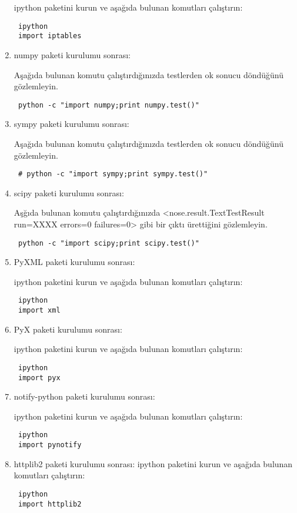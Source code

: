 \documentclass[a4paper,10pt]{article}
\begin{document}
\begin{enumerate}
ipython paketini kurun ve aşağıda bulunan komutları çalıştırın:
\begin{verbatim}
 ipython
 import iptables
\end{verbatim}

\item numpy paketi kurulumu sonrası:

Aşağıda bulunan komutu çalıştırdığınızda testlerden ok sonucu döndüğünü gözlemleyin.
\begin{verbatim}
 python -c "import numpy;print numpy.test()"
\end{verbatim}

\item sympy paketi kurulumu sonrası:

Aşağıda bulunan komutu çalıştırdığınızda testlerden ok sonucu döndüğünü gözlemleyin.
\begin{verbatim}
 # python -c "import sympy;print sympy.test()"
\end{verbatim}

\item scipy paketi kurulumu sonrası:

Aşğıda bulunan komutu çalıştırdığınızda <nose.result.TextTestResult run=XXXX errors=0 failures=0> gibi bir çıktı ürettiğini gözlemleyin.
\begin{verbatim}
 python -c "import scipy;print scipy.test()"
\end{verbatim}

\item PyXML paketi kurulumu sonrası:

ipython paketini kurun ve aşağıda bulunan komutları çalıştırın:
\begin{verbatim}
 ipython
 import xml
\end{verbatim}


\item PyX paketi kurulumu sonrası:

ipython paketini kurun ve aşağıda bulunan komutları çalıştırın:
\begin{verbatim}
 ipython
 import pyx
\end{verbatim}

\item notify-python paketi kurulumu sonrası:

ipython paketini kurun ve aşağıda bulunan komutları çalıştırın:
\begin{verbatim}
 ipython
 import pynotify
\end{verbatim}


\item httplib2 paketi kurulumu sonrası:
ipython paketini kurun ve aşağıda bulunan komutları çalıştırın:
\begin{verbatim}
 ipython
 import httplib2
\end{verbatim}


\end{enumerate}
\end{document}
